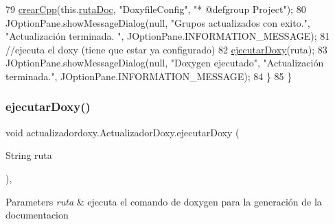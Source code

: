 \begin{DoxyCode}
79             \mbox{\hyperlink{classactualizadordoxy_1_1_actualizador_doxy_aebb9505e0384909ac6e2e677f400eaec}{crearCpp}}(this.\mbox{\hyperlink{classactualizadordoxy_1_1_actualizador_doxy_a5655cc699bfc4a0b01432170892663d8}{rutaDoc}}, \textcolor{stringliteral}{"DoxyfileConfig"}, \textcolor{stringliteral}{"*  @defgroup Project"});
80             JOptionPane.showMessageDialog(null, \textcolor{stringliteral}{"Grupos actualizados con exito."}, \textcolor{stringliteral}{"Actualización terminada.
      "}, JOptionPane.INFORMATION\_MESSAGE);
81             \textcolor{comment}{//ejecuta el doxy (tiene que estar ya configurado)}
82             \mbox{\hyperlink{classactualizadordoxy_1_1_actualizador_doxy_ae7d94f01945c2c9c2d1fab249652cc70}{ejecutarDoxy}}(ruta);
83             JOptionPane.showMessageDialog(null, \textcolor{stringliteral}{"Doxygen ejecutado"}, \textcolor{stringliteral}{"Actualización terminada."}, 
      JOptionPane.INFORMATION\_MESSAGE);
84         \}        
85     \}
\end{DoxyCode}
\mbox{\label{classactualizadordoxy_1_1_actualizador_doxy_ae7d94f01945c2c9c2d1fab249652cc70}} 
\subsubsection{\texorpdfstring{ejecutar\+Doxy()}{ejecutarDoxy()}}
{\footnotesize\ttfamily void actualizadordoxy.\+Actualizador\+Doxy.\+ejecutar\+Doxy (\begin{DoxyParamCaption}\item[{String}]{ruta }\end{DoxyParamCaption})\hspace{0.3cm}{\ttfamily [inline]}, {\ttfamily [private]}}


\begin{DoxyParams}{Parameters}
{\em ruta} & ejecuta el comando de doxygen para la generación de la documentacion \\
\hline
\end{DoxyParams}

